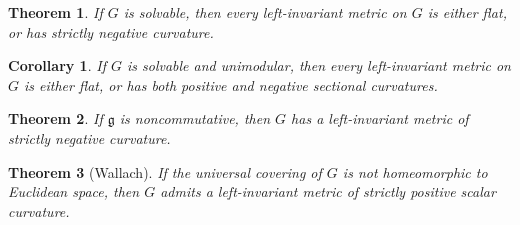 \documentclass{article}
\newtheorem{thm}{Theorem}
\newtheorem{cor}{Corollary}
\begin{document}
\begin{thm}
If $G$ is solvable, then every left-invariant metric on $G$ is either flat, or has strictly negative curvature.
\end{thm}

\begin{cor}
If $G$ is solvable and unimodular, then every left-invariant metric on $G$ is either flat, or has both positive and negative sectional curvatures.
\end{cor}

\begin{thm}
If $\mathfrak{g}$ is noncommutative, then $G$ has a left-invariant metric of strictly negative curvature.
\end{thm}

\begin{thm}[Wallach]
If the universal covering of $G$ is not homeomorphic to Euclidean space, then $G$ admits a left-invariant metric of strictly positive scalar curvature.
\end{thm}
\end{document}
